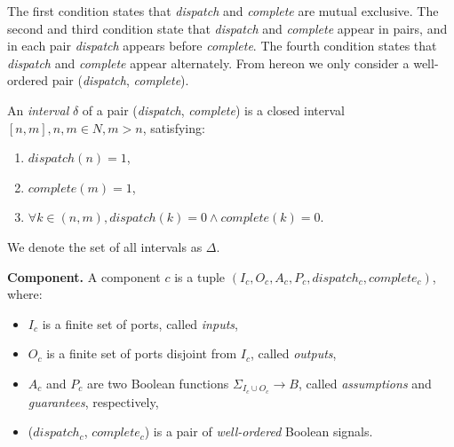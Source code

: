 The first condition states that \emph{dispatch} and \emph{complete} are mutual exclusive. The second and third condition state that \emph{dispatch} and \emph{complete} appear in pairs, and in each pair \emph{dispatch} appears before \emph{complete}. The fourth condition states that \emph{dispatch} and \emph{complete} appear alternately. 
From hereon we only consider a well-ordered pair (\emph{dispatch}, \emph{complete}).

An \emph{interval} $\delta$ of a pair (\emph{dispatch}, \emph{complete}) is a closed interval $[n, m], n,m \in N, m>n$, satisfying:

\begin{enumerate}
	\item $ dispatch(n) = 1 $, 
	\item $ complete(m) = 1 $, 
	\item $ \forall k\in (n, m), dispatch(k)=0 \wedge complete(k)=0 $.
\end{enumerate}

We denote the set of all intervals as $\Delta$.

{\bf Component.}
A component $c$ is a tuple $(I_c, O_c, A_c, P_c, dispatch_c, complete_c)$, where: 

\begin{itemize}
    	\item $I_c$ is a finite set of ports, called \emph{inputs},
    	\item $O_c$ is a finite set of ports disjoint from $I_c$, called \emph{outputs},
	\item $A_c$ and $P_c$ are two Boolean functions $\Sigma_{I_c \cup O_c} \rightarrow B$, called \emph{assumptions} and \emph{guarantees}, respectively,	
    	\item ($dispatch_c$, $complete_c$) is a pair of \emph{well-ordered} Boolean signals.
\end{itemize}


